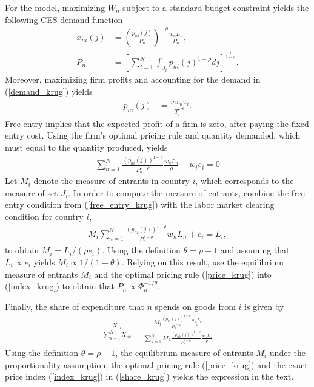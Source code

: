 \documentclass[12pt,dvips, ps2pdf]{article}
\begin{document}
\begin{appendix}
For the \citet{krug80} model, maximizing $W_n$ subject to a standard budget constraint yields the following CES demand function
\begin{align}
x_{ni}(j)&=\left(\frac{p_{ni}(j)}{P_n}\right)^{-\rho}\frac{w_nL_n}{P_n},\label{demand_krug}\\
P_n&=\left[\sum_{i=1}^N\int_{J_i}p_{ni}(j)^{1-\rho}dj\right]^\frac{1}{1-\rho}.\label{index_krug}
\end{align}
Moreover, maximizing firm profits and accounting for the demand in (\ref{demand_krug}) yields
\begin{align}
p_{ni}(j)&=\frac{\bar m\tau_{ni}w_i}{T_i^{1/\theta}}.\label{price_krug}
\end{align}
Free entry implies that the expected profit of a firm is zero, after paying the fixed entry cost. Using the firm's optimal pricing rule and quantity demanded, which must equal to the quantity produced, yields
\begin{align}
\sum_{n=1}^N\frac{(p_{ni}(j))^{1-\rho}}{P_n^{1-\rho}}\frac{w_nL_n}{\rho}-w_ie_i=0\label{free_entry_krug}
\end{align}
Let $M_i$ denote the measure of entrants in country $i$, which corresponds to the measure of set $J_i$. In order to compute the measure of entrants, combine the free entry condition from (\ref{free_entry_krug}) with the labor market clearing condition for country $i$,
\begin{align}
M_i\sum_{n=1}^N\frac{(p_{ni}(j))^{1-\rho}}{P_n^{1-\rho}}{w_nL_n}+e_i=L_i\label{labor_krug},
\end{align}
to obtain $M_i=L_i/(\rho e_i)$. Using the definition $\theta=\rho-1$ and assuming that $L_i\propto e_i$ yields $M_i\propto 1/(1+\theta)$. Relying on this result, use the equilibrium measure of entrants $M_i$ and the optimal pricing rule (\ref{price_krug}) into (\ref{index_krug}) to obtain that $P_n\propto \Phi_n^{-{1}/{\theta}}$.

Finally, the share of expenditure that $n$ spends on goods from $i$ is given by
\begin{align}
\frac{X_{ni}}{\sum_{k=1}^NX_{nk}}=\frac{M_i\frac{(p_{ni}(j))^{1-\rho}}{P_n^{1-\rho}}\frac{w_nL_n}{\rho}}{\sum_{k=1}^NM_k\frac{(p_{nk}(j))^{1-\rho}}{P_n^{1-\rho}}\frac{w_nL_n}{\rho}}\label{share_krug}
\end{align}
Using the definition $\theta=\rho-1$, the equilibrium measure of entrants $M_i$ under the proportionality assumption, the optimal pricing rule (\ref{price_krug}) and the exact price index (\ref{index_krug}) in (\ref{share_krug}) yields the expression in the text.


\end{appendix}
\end{document}
